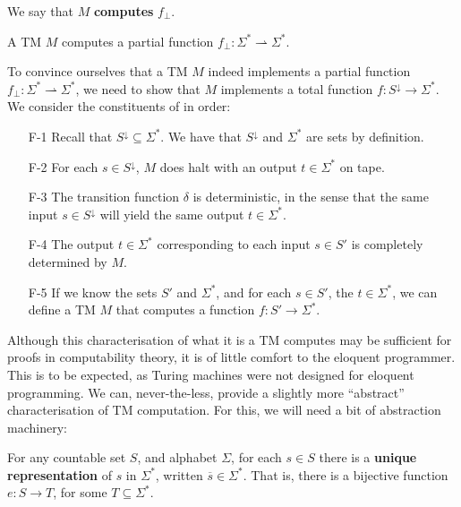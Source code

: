 We say that $M$ \textbf{computes} $f_\bot$.

\begin{definition} A TM $M$ computes a partial function $f_\bot : \Sigma^*
\rightharpoonup \Sigma^*$. \end{definition}

To convince ourselves that a TM $M$ indeed implements a partial function
$f_\bot : \Sigma^* \rightharpoonup \Sigma^*$, we need to show that $M$
implements a total function $f:S^\downarrow \rightarrow \Sigma^*$. We consider
the constituents of  in order:

\begin{enumerate}

\item [F-1] Recall that $S^\downarrow \subseteq \Sigma^*$. We have that
$S^\downarrow$ and $\Sigma^*$ are sets by definition.

\item [F-2] For each $s\in S^\downarrow$, $M$ does halt with an output
$t\in\Sigma^*$ on tape.

\item [F-3] The transition function $\delta$ is
deterministic, in the sense that the same input $s\in S^\downarrow$ will yield
the same output $t\in\Sigma^*$.

\item [F-4] The output $t\in\Sigma^*$ corresponding to each input $s\in S'$ is
completely determined by $M$.

\item [F-5] If we know the sets $S'$ and $\Sigma^*$, and for each $s\in S'$,
the $t\in \Sigma^*$, we can define a TM $M$ that computes a function
$f:S'\rightarrow \Sigma^*$.

\end{enumerate}

Although this characterisation of what it is a TM computes may be sufficient
for proofs in computability theory, it is of little comfort to the eloquent
programmer. This is to be expected, as Turing machines were not designed for
eloquent programming. We can, never-the-less, provide a slightly more
``abstract'' characterisation of TM computation. For this, we will need a bit
of abstraction machinery:


\begin{theorem}\label{thm:unique-representation} For any countable set $S$, and
alphabet $\Sigma$, for each $s\in S$ there is a \textbf{unique representation}
of $s$ in $\Sigma^*$, written $\overline{s}\in\Sigma^*$. That is, there is a
bijective function $e : S \rightarrow T$, for some $T \subseteq \Sigma^*$.
\end{theorem}

